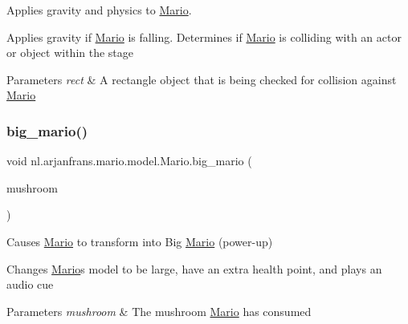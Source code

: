 Applies gravity and physics to \hyperlink{classnl_1_1arjanfrans_1_1mario_1_1model_1_1Mario}{Mario}. 

Applies gravity if \hyperlink{classnl_1_1arjanfrans_1_1mario_1_1model_1_1Mario}{Mario} is falling. Determines if \hyperlink{classnl_1_1arjanfrans_1_1mario_1_1model_1_1Mario}{Mario} is colliding with an actor or object within the stage 
\begin{DoxyParams}{Parameters}
{\em rect} & A rectangle object that is being checked for collision against \hyperlink{classnl_1_1arjanfrans_1_1mario_1_1model_1_1Mario}{Mario} \\
\hline
\end{DoxyParams}
\mbox{\label{classnl_1_1arjanfrans_1_1mario_1_1model_1_1Mario_a002115bd2f3f057d21ec38f4f5cfa833}} 
\subsubsection{\texorpdfstring{big\+\_\+mario()}{big\_mario()}}
{\footnotesize\ttfamily void nl.\+arjanfrans.\+mario.\+model.\+Mario.\+big\+\_\+mario (\begin{DoxyParamCaption}\item[{\hyperlink{classnl_1_1arjanfrans_1_1mario_1_1model_1_1Mushroom}{Mushroom}}]{mushroom }\end{DoxyParamCaption})\hspace{0.3cm}{\ttfamily [private]}}



Causes \hyperlink{classnl_1_1arjanfrans_1_1mario_1_1model_1_1Mario}{Mario} to transform into Big \hyperlink{classnl_1_1arjanfrans_1_1mario_1_1model_1_1Mario}{Mario} (power-\/up) 

Changes \hyperlink{classnl_1_1arjanfrans_1_1mario_1_1model_1_1Mario}{Mario}\textquotesingle{}s model to be large, have an extra health point, and plays an audio cue 
\begin{DoxyParams}{Parameters}
{\em mushroom} & The mushroom \hyperlink{classnl_1_1arjanfrans_1_1mario_1_1model_1_1Mario}{Mario} has consumed \\
\hline
\end{DoxyParams}
\mbox{\label{classnl_1_1arjanfrans_1_1mario_1_1model_1_1Mario_a8e22f381330317da3aca016f4713f88a}} 
